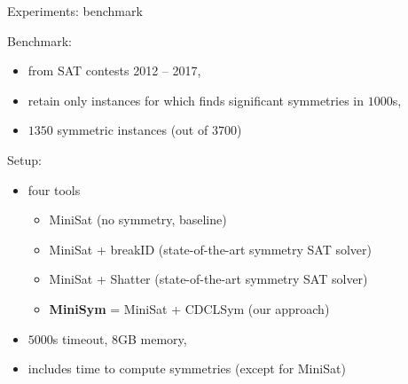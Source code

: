 \documentclass{beamer}
\begin{document}
\begin{frame}{Experiments: benchmark}

Benchmark:
\begin{itemize}
	\item from SAT contests 2012 -- 2017,
	\item retain only instances for which \bliss{} finds significant symmetries in $1000$s,
	\item $1350$ symmetric instances (out of $3700$)
\end{itemize}

Setup:
\begin{itemize}
	\item four tools
	\begin{itemize}
		\item MiniSat (no symmetry, baseline)
		\item MiniSat + breakID (state-of-the-art symmetry SAT solver)
		\item MiniSat + Shatter (state-of-the-art symmetry SAT solver)
		\item \textbf{MiniSym} = MiniSat + CDCLSym (our approach)
	\end{itemize}
	\item $5000$s timeout, $8$GB memory,
	\item includes time to compute symmetries (except for MiniSat)
\end{itemize}

\end{frame}
\end{document}
